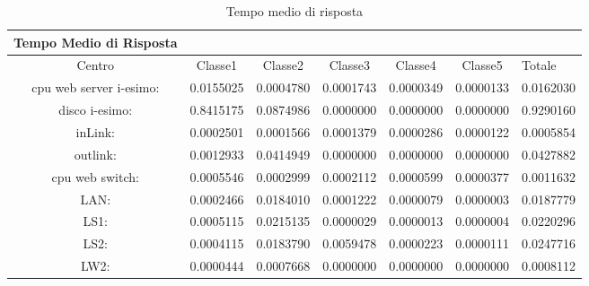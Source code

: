 \begin{table}[htbp]
\caption{Tempo medio di risposta}
\begin{center}
\begin{tabular}{||c|c|c|c|c|c||}
\hline
Tempo Medio di Risposta\\
\hline
Centro &Classe1 &Classe2 &Classe3 &Classe4 &Classe5 &Totale\\
\hline
\hline
 cpu web server i-esimo: 	&0.0155025	&0.0004780	&0.0001743	&0.0000349	&0.0000133	&0.0162030\\
\hline
 disco i-esimo: 	&0.8415175	&0.0874986	&0.0000000	&0.0000000	&0.0000000	&0.9290160\\
\hline
 inLink: 	&0.0002501	&0.0001566	&0.0001379	&0.0000286	&0.0000122	&0.0005854\\
\hline
 outlink: 	&0.0012933	&0.0414949	&0.0000000	&0.0000000	&0.0000000	&0.0427882\\
\hline
 cpu web switch: 	&0.0005546	&0.0002999	&0.0002112	&0.0000599	&0.0000377	&0.0011632\\
\hline
 LAN: 	&0.0002466	&0.0184010	&0.0001222	&0.0000079	&0.0000003	&0.0187779\\
\hline
 LS1: 	&0.0005115	&0.0215135	&0.0000029	&0.0000013	&0.0000004	&0.0220296\\
\hline
 LS2: 	&0.0004115	&0.0183790	&0.0059478	&0.0000223	&0.0000111	&0.0247716\\
\hline
 LW2: 	&0.0000444	&0.0007668	&0.0000000	&0.0000000	&0.0000000	&0.0008112\\
\hline
\end{tabular}
\end{center}
\label{tempomediorisposta}
\end{table}

